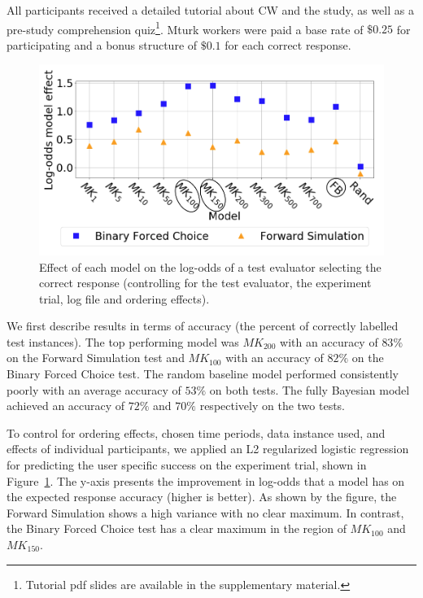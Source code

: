\documentclass[letterpaper]{article}
\begin{document}
All participants received a detailed tutorial about CW and the study, as well as a pre-study comprehension quiz\footnote{Tutorial pdf slides are available in the supplementary material.}. Mturk workers were paid a base rate of $\$0.25$ for participating and a bonus structure of $\$0.1$ for each correct response.






\begin{figure}[t]


\includegraphics[width=.48\textwidth]{images/combined_res_data_all.png}
\vspace{-0.94mm}
\vspace{-1.53mm}
\vspace{-2.44mm}
\caption{Effect of each model on the log-odds of a test evaluator selecting the correct response (controlling for the test evaluator, the experiment trial, log file and ordering effects).}
\label{fig:essil_test_results}
\end{figure}


We first describe results in terms of accuracy (the percent of correctly labelled test instances).
The top performing model was $MK_{200}$ with an accuracy of $83\%$ on the Forward Simulation  test and $MK_{100}$  with an accuracy of $82\%$ on the Binary Forced Choice test.
The random baseline model performed consistently poorly with an average accuracy of $53\%$ on both tests.
The fully Bayesian model achieved an accuracy of $72\%$ and $70\%$ respectively on the two tests.

\vspace{-1.77mm}
\vspace{-1.77mm}
\vspace{-1.77mm}
\vspace{-1.77mm}
\vspace{-1.77mm}
To control for ordering effects, chosen time periods, data instance used, and effects of individual participants, we applied an L2 regularized logistic regression for predicting  the user specific success on the experiment trial, shown  in  Figure~\ref{fig:essil_test_results}. The y-axis presents the improvement in log-odds that a model has on the expected response accuracy (higher is better).
As shown by the figure,  the Forward Simulation shows a high variance with no clear maximum. In contrast, the Binary Forced Choice test has a clear maximum in the region of $MK_{100}$ and $MK_{150}$.
\end{document}
